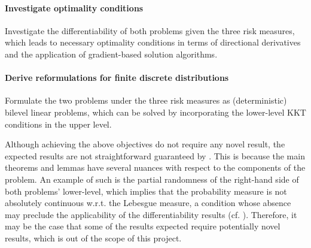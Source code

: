 \documentclass[twoside,11pt]{article}
\begin{document}
\paragraph{Investigate optimality conditions}
Investigate the differentiability of both problems given the three risk measures, which leads to necessary optimality conditions in terms of directional derivatives and the application of gradient-based solution algorithms.
\paragraph{Derive reformulations for finite discrete distributions}
Formulate the two problems under the three risk measures as (deterministic) bilevel linear problems, which can be solved by incorporating the lower-level KKT conditions in the upper level.

Although achieving the above objectives do not require any novel result, the expected results are not straightforward guaranteed by \citet{burtscheidtRiskAverseModelsBilevel2020}.
This is because the main theorems and lemmas have several nuances with respect to the components of the problem.
An example of such is the partial randomness of the right-hand side of both problems' lower-level, which implies that the probability measure is not absolutely continuous w.r.t. the Lebesgue measure, a condition whose absence may preclude the applicability of the differentiability results (cf. \cite[Sec.~4]{burtscheidtRiskAverseModelsBilevel2020}).
Therefore, it may be the case that some of the results expected require potentially novel results, which is out of the scope of this project.





% 
\printbibliography
    
\end{document}
